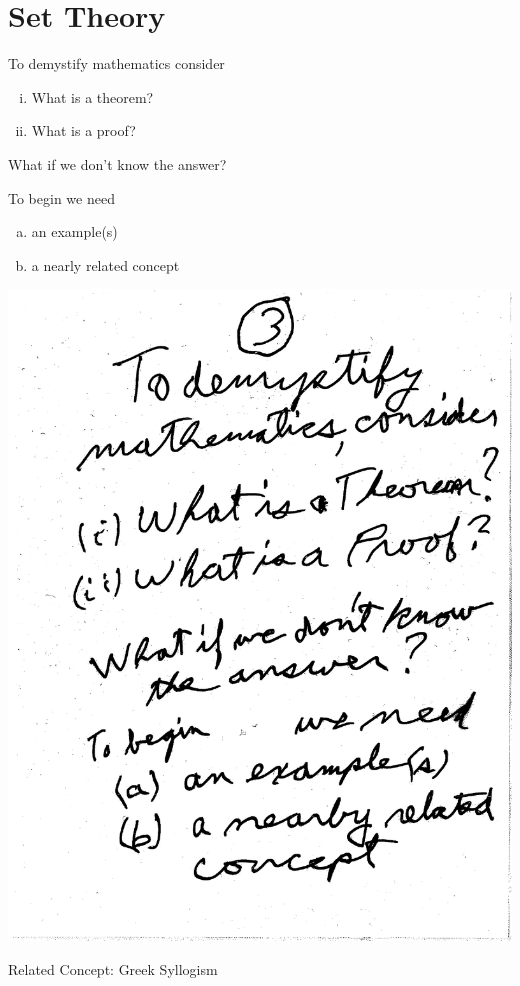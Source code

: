 \documentclass[10pt,a4paper]{article}
\begin{document}
\section{Set Theory}

To demystify mathematics consider
\begin{enumerate}[(i)]
\item What is a theorem?
\item What is a proof?
\end{enumerate}
What if we don't know the answer?

To begin we need
\begin{enumerate}[(a)]
\item an example(s)
\item a nearly related concept
\end{enumerate}


\includegraphics[scale=.5]{Pages/ST_3}

\newpage

Related Concept: Greek Syllogism
\end{document}
